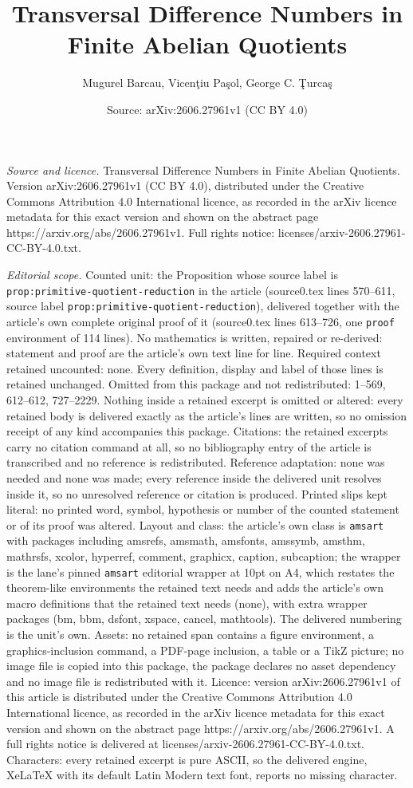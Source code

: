 \documentclass[10pt,a4paper]{amsart}
\title[Transversal Difference Numbers in Finite Abelian Quotients]{Transversal Difference Numbers in Finite Abelian Quotients}
\author{Mugurel Barcau, Vicen\c{t}iu Pa\c{s}ol, George C. \c{T}urca\c{s}}
\date{Source: arXiv:2606.27961v1 (CC BY 4.0)}
\begin{document}
\maketitle

\noindent\emph{Source and licence.} Transversal Difference Numbers in Finite Abelian Quotients. Version arXiv:2606.27961v1 (CC BY 4.0), distributed under the Creative Commons Attribution 4.0 International licence, as recorded in the arXiv licence metadata for this exact version and shown on the abstract page https://arxiv.org/abs/2606.27961v1. Full rights notice: licenses/arxiv-2606.27961-CC-BY-4.0.txt.\par\smallskip

\noindent\textit{Editorial scope.} Counted unit: the Proposition whose source label is \texttt{prop:primitive-quotient-reduction} in the article (source0.tex lines 570--611, source label \texttt{prop:primitive-quotient-reduction}), delivered together with the article's own complete original proof of it (source0.tex lines 613--726, one \texttt{proof} environment of 114 lines). No mathematics is written, repaired or re-derived: statement and proof are the article's own text line for line. Required context retained uncounted: none. Every definition, display and label of those lines is retained unchanged. Omitted from this package and not redistributed: 1--569, 612--612, 727--2229. Nothing inside a retained excerpt is omitted or altered: every retained body is delivered exactly as the article's lines are written, so no omission receipt of any kind accompanies this package. Citations: the retained excerpts carry no citation command at all, so no bibliography entry of the article is transcribed and no reference is redistributed. Reference adaptation: none was needed and none was made; every reference inside the delivered unit resolves inside it, so no unresolved reference or citation is produced. Printed slips kept literal: no printed word, symbol, hypothesis or number of the counted statement or of its proof was altered. Layout and class: the article's own class is \texttt{amsart} with packages including amsrefs, amsmath, amsfonts, amssymb, amsthm, mathrsfs, xcolor, hyperref, comment, graphicx, caption, subcaption; the wrapper is the lane's pinned \texttt{amsart} editorial wrapper at 10pt on A4, which restates the theorem-like environments the retained text needs and adds the article's own macro definitions that the retained text needs (none), with extra wrapper packages (bm, bbm, dsfont, xspace, cancel, mathtools). The delivered numbering is the unit's own. Assets: no retained span contains a figure environment, a graphics-inclusion command, a PDF-page inclusion, a table or a TikZ picture; no image file is copied into this package, the package declares no asset dependency and no image file is redistributed with it. Licence: version arXiv:2606.27961v1 of this article is distributed under the Creative Commons Attribution 4.0 International licence, as recorded in the arXiv licence metadata for this exact version and shown on the abstract page https://arxiv.org/abs/2606.27961v1. A full rights notice is delivered at licenses/arxiv-2606.27961-CC-BY-4.0.txt. Characters: every retained excerpt is pure ASCII, so the delivered engine, XeLaTeX with its default Latin Modern text font, reports no missing character.
\end{document}
